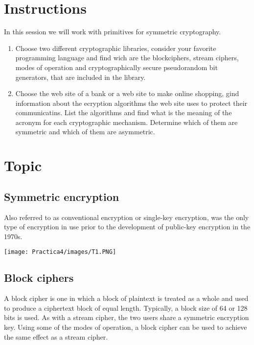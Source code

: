 \documentclass[12pt]{article}
\begin{document}
	\tableofcontents
	\newpage
	
	\section{Instructions}
        In this session we will work with primitives for symmetric cryptography.
        \begin{enumerate}
            \item Choose two different cryptographic libraries, consider your favorite programming language and find wich are the blockciphers, stream ciphers, modes of operation and cryptographically secure pseudorandom bit generators, that are included in the library.
            
            \item Choose the web site of a bank or a web site to make online shopping, gind information about the ecryption algorithms the web site uses to protect their communicatins. List the algorithms and find what is the meaning of the acronym for each cryptographic mechanism. Determine which of them are symmetric and which of them are asymmetric.
        \end{enumerate}
	
	\section{Topic}
	    \subsection{Symmetric encryption}
	        Also referred to as conventional encryption or single-key encryption, was the only type of encryption in use prior to the development of public-key encryption in the 1970s.
	        
	        \begin{center}
                \texttt{[image: Practica4/images/T1.PNG]}
            \end{center}
	
	    \subsection{Block ciphers}
	        A block cipher is one in which a block of plaintext is treated as a whole and used to produce a ciphertext block of equal length. Typically,  a block size of 64 or 128 bits is used. As with a stream cipher, the two users share a symmetric encryption key. Using some of the modes of operation, a block cipher can be used to achieve the same effect as a stream cipher. 
	        
\end{document}
